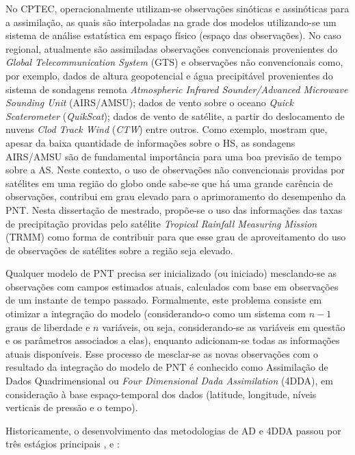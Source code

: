 No CPTEC, operacionalmente utilizam-se observações sinóticas e assinóticas para a assimilação, as quais são interpoladas na grade dos modelos utilizando-se um sistema de análise estatística em espaço físico (espaço das observações). No caso regional, atualmente são assimiladas observações convencionais provenientes do \textit{Global Telecommunication System} (GTS) e observações não convencionais como, por exemplo, dados de altura geopotencial e água precipitável provenientes do sistema de sondagens remota \textit{Atmospheric Infrared Sounder/Advanced Microwave Sounding Unit} (AIRS/AMSU); dados de vento sobre o oceano \textit{Quick Scaterometer} (\textit{QuikScat}); dados de vento de satélite, a partir do deslocamento de nuvens \textit{Clod Track Wind} (\textit{CTW}) entre outros. Como exemplo, \cite{andreolietal07} mostram que, apesar da baixa quantidade de informações sobre o HS, as sondagens AIRS/AMSU são de fundamental importância para uma boa previsão de tempo sobre a AS. Neste contexto, o uso de observações não convencionais providas por satélites em uma região do globo onde sabe-se que há uma grande carência de observações, contribui em grau elevado para o aprimoramento do desempenho da PNT. Nesta dissertação de mestrado, propõe-se o uso das informações das taxas de precipitação providas pelo satélite \textit{Tropical Rainfall Measuring Mission} (TRMM) como forma de contribuir para que esse grau de aproveitamento do uso de observações de satélites sobre a região seja elevado.

Qualquer modelo de PNT precisa ser inicializado (ou iniciado) mesclando-se as observações com campos estimados atuais, calculados com base em observações de um instante de tempo passado. Formalmente, este problema consiste em otimizar a integração do modelo (considerando-o como um sistema com $n-1$ graus de liberdade e $n$ variáveis, ou seja, considerando-se as variáveis em questão e os parâmetros associados a elas), enquanto adicionam-se todas as informações atuais disponíveis. Esse processo de mesclar-se as novas observações com o resultado da integração do modelo de PNT é conhecido como Assimilação de Dados Quadrimensional ou \textit{Four Dimensional Dada Assimilation} (4DDA), em consideração à base espaço-temporal dos dados (latitude, longitude, níveis verticais de pressão e o tempo).

Historicamente, o desenvolvimento das metodologias de AD e 4DDA passou por três estágios principais \cite{wangetal00}, e \cite{kalnay03}:

